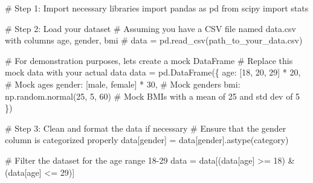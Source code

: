 \documentclass[
  letterpaper,
  DIV=11,
  numbers=noendperiod]{scrartcl}
\newenvironment{Shaded}{\begin{snugshade}}{\end{snugshade}}
\newcommand{\CommentTok}[1]{\textcolor[rgb]{0.37,0.37,0.37}{#1}}
\newcommand{\DecValTok}[1]{\textcolor[rgb]{0.68,0.00,0.00}{#1}}
\newcommand{\ImportTok}[1]{\textcolor[rgb]{0.00,0.46,0.62}{#1}}
\newcommand{\NormalTok}[1]{\textcolor[rgb]{0.00,0.23,0.31}{#1}}
\newcommand{\OperatorTok}[1]{\textcolor[rgb]{0.37,0.37,0.37}{#1}}
\newcommand{\StringTok}[1]{\textcolor[rgb]{0.13,0.47,0.30}{#1}}
\begin{document}
\begin{Shaded}
\begin{Highlighting}[]
\CommentTok{\# Step 1: Import necessary libraries}
\ImportTok{import}\NormalTok{ pandas }\ImportTok{as}\NormalTok{ pd}
\ImportTok{from}\NormalTok{ scipy }\ImportTok{import}\NormalTok{ stats}

\CommentTok{\# Step 2: Load your dataset}
\CommentTok{\# Assuming you have a CSV file named \textquotesingle{}data.csv\textquotesingle{} with columns \textquotesingle{}age\textquotesingle{}, \textquotesingle{}gender\textquotesingle{}, \textquotesingle{}bmi\textquotesingle{}}
\CommentTok{\# data = pd.read\_csv(\textquotesingle{}path\_to\_your\_data.csv\textquotesingle{})}

\CommentTok{\# For demonstration purposes, let\textquotesingle{}s create a mock DataFrame}
\CommentTok{\# Replace this mock data with your actual data}
\NormalTok{data }\OperatorTok{=}\NormalTok{ pd.DataFrame(\{}
    \StringTok{\textquotesingle{}age\textquotesingle{}}\NormalTok{: [}\DecValTok{18}\NormalTok{, }\DecValTok{20}\NormalTok{, }\DecValTok{29}\NormalTok{] }\OperatorTok{*} \DecValTok{20}\NormalTok{,  }\CommentTok{\# Mock ages}
    \StringTok{\textquotesingle{}gender\textquotesingle{}}\NormalTok{: [}\StringTok{\textquotesingle{}male\textquotesingle{}}\NormalTok{, }\StringTok{\textquotesingle{}female\textquotesingle{}}\NormalTok{] }\OperatorTok{*} \DecValTok{30}\NormalTok{,  }\CommentTok{\# Mock genders}
    \StringTok{\textquotesingle{}bmi\textquotesingle{}}\NormalTok{: np.random.normal(}\DecValTok{25}\NormalTok{, }\DecValTok{5}\NormalTok{, }\DecValTok{60}\NormalTok{)  }\CommentTok{\# Mock BMIs with a mean of 25 and std dev of 5}
\NormalTok{\})}

\CommentTok{\# Step 3: Clean and format the data if necessary}
\CommentTok{\# Ensure that the \textquotesingle{}gender\textquotesingle{} column is categorized properly}
\NormalTok{data[}\StringTok{\textquotesingle{}gender\textquotesingle{}}\NormalTok{] }\OperatorTok{=}\NormalTok{ data[}\StringTok{\textquotesingle{}gender\textquotesingle{}}\NormalTok{].astype(}\StringTok{\textquotesingle{}category\textquotesingle{}}\NormalTok{)}

\CommentTok{\# Filter the dataset for the age range 18{-}29}
\NormalTok{data }\OperatorTok{=}\NormalTok{ data[(data[}\StringTok{\textquotesingle{}age\textquotesingle{}}\NormalTok{] }\OperatorTok{\textgreater{}=} \DecValTok{18}\NormalTok{) }\OperatorTok{\&}\NormalTok{ (data[}\StringTok{\textquotesingle{}age\textquotesingle{}}\NormalTok{] }\OperatorTok{\textless{}=} \DecValTok{29}\NormalTok{)]}


\end{Highlighting}
\end{Shaded}
\end{document}
